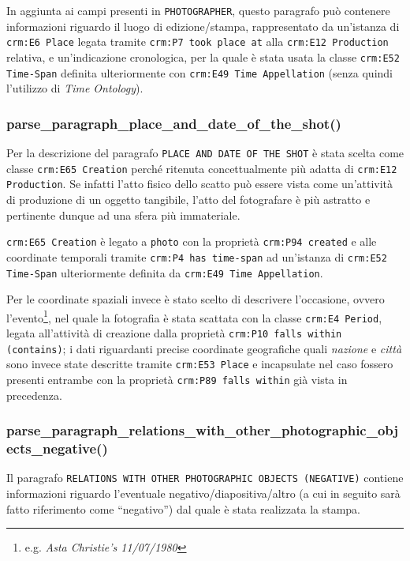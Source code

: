 In aggiunta ai campi presenti in \texttt{PHOTOGRAPHER}, questo paragrafo può contenere informazioni riguardo il luogo di edizione/stampa, rappresentato da un'istanza di \texttt{crm:E6 Place} legata tramite \texttt{crm:P7 took place at} alla \texttt{crm:E12 Production} relativa, e un'indicazione cronologica, per la quale è stata usata la classe \texttt{crm:E52 Time-Span} definita ulteriormente con \texttt{crm:E49 Time Appellation} (senza quindi l'utilizzo di \emph{Time Ontology}).

\subsubsection{parse\_paragraph\_place\_and\_date\_of\_the\_shot()}
Per la descrizione del paragrafo \texttt{PLACE AND DATE OF THE SHOT} è stata scelta come classe \texttt{crm:E65 Creation} perché ritenuta concettualmente più adatta di \texttt{crm:E12 Production}. Se infatti l'atto fisico dello scatto può essere vista come un'attività di produzione di un oggetto tangibile, l'atto del fotografare è più astratto e pertinente dunque ad una sfera più immateriale.

\texttt{crm:E65 Creation} è legato a \texttt{photo} con la proprietà \texttt{crm:P94 created} e alle coordinate temporali tramite \texttt{crm:P4 has time-span} ad un'istanza di \texttt{crm:E52 Time-Span} ulteriormente definita da \texttt{crm:E49 Time Appellation}.

Per le coordinate spaziali invece è stato scelto di descrivere l'occasione, ovvero l'evento\footnote{e.g. \emph{Asta Christie's 11/07/1980}}, nel quale la fotografia è stata scattata con la classe \texttt{crm:E4 Period}, legata all'attività di creazione dalla proprietà \texttt{crm:P10 falls within (contains)}; i dati riguardanti precise coordinate geografiche quali \emph{nazione} e \emph{città} sono invece state descritte tramite \texttt{crm:E53 Place} e incapsulate nel caso fossero presenti entrambe con la proprietà \texttt{crm:P89 falls within} già vista in precedenza.

\subsubsection{parse\_paragraph\_relations\_with\_other\_photographic\_objects\_negative()}
Il paragrafo \texttt{RELATIONS WITH OTHER PHOTOGRAPHIC OBJECTS (NEGATIVE)} contiene informazioni riguardo l'eventuale negativo/diapositiva/altro (a cui in seguito sarà fatto riferimento come ``negativo'') dal quale è stata realizzata la stampa.

